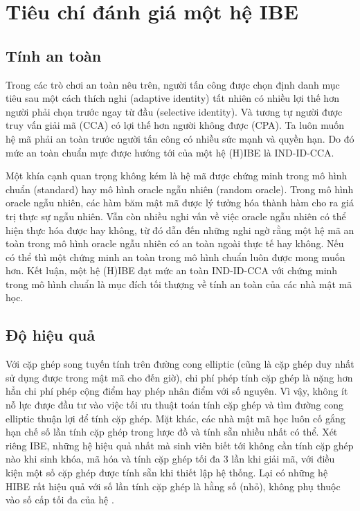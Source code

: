 \documentclass[class=report, crop=false]{standalone}
\begin{document}
	\section{Tiêu chí đánh giá một hệ IBE}
		\subsection{Tính an toàn}
			Trong các trò chơi an toàn nêu trên, người tấn công được chọn định danh mục tiêu sau một cách thích nghi (adaptive identity) tất nhiên có nhiều lợi thế hơn người phải chọn trước ngay từ đầu (selective identity). Và tương tự người được truy vấn giải mã (CCA) có lợi thế hơn người không được (CPA). Ta luôn muốn hệ mã phải an toàn trước người tấn công có nhiều sức mạnh và quyền hạn. Do đó mức an toàn chuẩn mực được hướng tới của một hệ (H)IBE là IND-ID-CCA.

			Một khía cạnh quan trọng không kém là hệ mã được chứng minh trong mô hình chuẩn (standard) hay mô hình oracle ngẫu nhiên (random oracle). Trong mô hình oracle ngẫu nhiên, các hàm băm mật mã được lý tưởng hóa thành hàm cho ra giá trị thực sự ngẫu nhiên. Vẫn còn nhiều nghi vấn về việc oracle ngẫu nhiên có thể hiện thực hóa được hay không, từ đó dẫn đến những nghi ngờ rằng một hệ mã an toàn trong mô hình oracle ngẫu nhiên có an toàn ngoài thực tế hay không. Nếu có thể thì một chứng minh an toàn trong mô hình chuẩn luôn được mong muốn hơn. Kết luận, một hệ (H)IBE đạt mức an toàn IND-ID-CCA với chứng minh trong mô hình chuẩn là mục đích tối thượng về tính an toàn của các nhà mật mã học.
		\subsection{Độ hiệu quả}
			Với cặp ghép song tuyến tính trên đường cong elliptic (cũng là cặp ghép duy nhất sử dụng được trong mật mã cho đến giờ), chi phí phép tính cặp ghép là nặng hơn hẳn chi phí phép cộng điểm hay phép nhân điểm với số nguyên. Vì vậy, không ít nỗ lực được đầu tư vào việc tối ưu thuật toán tính cặp ghép và tìm đường cong elliptic thuận lợi để tính cặp ghép. Mặt khác, các nhà mật mã học luôn cố gắng hạn chế số lần tính cặp ghép trong lược đồ và tính sẵn nhiều nhất có thể. Xét riêng IBE, những hệ hiệu quả nhất mà sinh viên biết tới không cần tính cặp ghép nào khi sinh khóa, mã hóa và tính cặp ghép tối đa 3 lần khi giải mã, với điều kiện một số cặp ghép được tính sẵn khi thiết lập hệ thống. Lại có những hệ HIBE rất hiệu quả với số lần tính cặp ghép là hằng số (nhỏ), không phụ thuộc vào số cấp tối đa của hệ \cite{DBLP:conf/eurocrypt/BonehBG05}.
\end{document}
